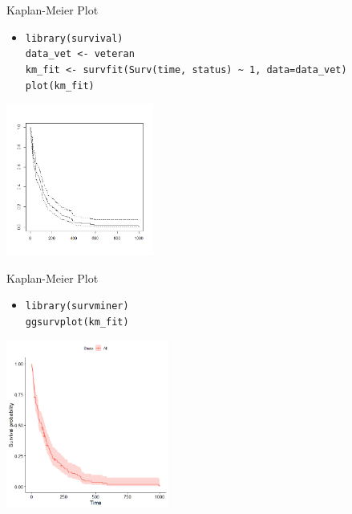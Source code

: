 \documentclass[xcolor=dvipsnames, aspectratio = 169]{beamer}
\begin{document}
\begin{frame}[fragile]{Kaplan-Meier Plot}
	\begin{itemize}
		\item \verb+library(survival)+ \\ \verb+data_vet <- veteran+ \\ \verb+km_fit <- survfit(Surv(time, status) ~ 1, data=data_vet)+ \\ \verb+plot(km_fit)+
	\end{itemize}
			
	\begin{center}
		\includegraphics[height=5cm]{KM1}
	\end{center}
\end{frame}

\begin{frame}[fragile]{Kaplan-Meier Plot}
	\begin{itemize}
		\item \verb+library(survminer)+ \\ \verb+ggsurvplot(km_fit)+
	\end{itemize}
			
	\begin{center}
		\includegraphics[height=5.5cm]{KM2}
	\end{center}
\end{frame}
\end{document}
